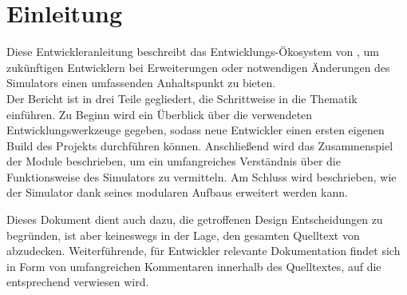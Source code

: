 
\section{Einleitung}

Diese Entwickleranleitung beschreibt das Entwicklungs-Ökosystem von \erasim, um
zukünftigen Entwicklern bei Erweiterungen oder notwendigen Änderungen des
Simulators einen umfassenden Anhaltspunkt zu bieten. \\
Der Bericht ist in drei Teile gegliedert, die Schrittweise in die Thematik
einführen. Zu Beginn wird ein Überblick über die verwendeten
Entwicklungswerkzeuge gegeben, sodass neue Entwickler einen ersten eigenen Build
des Projekts durchführen können. Anschließend wird das Zusammenspiel der
Module beschrieben, um ein umfangreiches Verständnis über die Funktionsweise
des Simulators zu vermitteln. Am Schluss wird beschrieben, wie der Simulator
dank seines modularen Aufbaus erweitert werden kann.

Dieses Dokument dient auch dazu, die getroffenen Design Entscheidungen zu
begründen, ist aber keineswegs in der Lage, den gesamten Quelltext von \erasim
abzudecken. Weiterführende, für Entwickler relevante Dokumentation findet sich
in Form von umfangreichen Kommentaren innerhalb des Quelltextes, auf die
entsprechend verwiesen wird.
